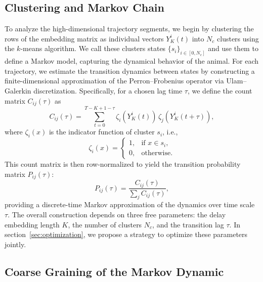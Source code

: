 \subsection{Clustering and Markov Chain}
\label{sec:markov}
To analyze the high-dimensional trajectory segments, we begin by clustering the rows of the embedding matrix as individual vectors \(  Y_K^i(t) \) into \( N_c \) clusters using the \( k \)-means algorithm. We call these clusters states \( \{s_i\}_{i\in[0,N_c]} \) and use them to define a Markov model, capturing the dynamical behavior of the animal. For each trajectory, we estimate the transition dynamics between states by constructing a finite-dimensional approximation of the Perron–Frobenius operator via Ulam–Galerkin discretization. Specifically, for a chosen lag time \( \tau \), we define the count matrix \( C_{ij}(\tau) \) as
\[
C_{ij}(\tau) = \sum_{t=0}^{T-K+1 - \tau} \zeta_i(Y_{K}^i(t)) \, \zeta_j(Y_{K}^i(t + \tau)),
\]
where \( \zeta_i(x) \) is the indicator function of cluster \( s_i \), i.e.,
\[
\zeta_i(x) =
\begin{cases}
1, & \text{if } x \in s_i, \\
0, & \text{otherwise}.
\end{cases}
\]
This count matrix is then row-normalized to yield the transition probability matrix \( P_{ij}(\tau) \):
\[
P_{ij}(\tau) = \frac{C_{ij}(\tau)}{\sum_j C_{ij}(\tau)},
\]
providing a discrete-time Markov approximation of the dynamics over time scale \( \tau \). The overall construction depends on three free parameters: the delay embedding length \( K \), the number of clusters \( N_c \), and the transition lag \( \tau \). In section~\ref{sec:optimization}, we propose a strategy to optimize these parameters jointly.
\subsection{Coarse Graining of the Markov Dynamic}